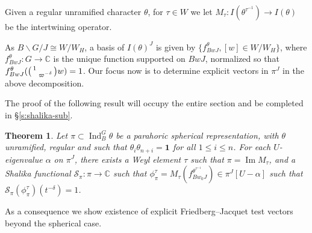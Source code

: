 \documentclass{amsart}
\newtheorem{theorem}[thm]{Theorem}
\theoremstyle{definition}
\newcommand{\Ind}{\operatorname{Ind}}
\renewcommand{\Im}{\operatorname{Im}}
\newenvironment{spmatrix}{\left(\begin{smallmatrix}}{\end{smallmatrix}\right)}
\begin{document}
{%


Given a regular unramified character $\theta$, for  $\tau\in W$ we let  $M_\tau:I(\theta^{\tau^{-1}})\to
I(\theta)$ be the intertwining operator. 


 As  $B \backslash G/ J\cong  W/W_H$, a basis of $I(\theta)^J$ is given by   $\{ f^\theta_{BwJ}, [w]\in W/W_H\}$,  
where $f^\theta_{BwJ}:G\to \mathbb{C}$ is the unique function  supported on $BwJ$, normalized so that $f^\theta_{BwJ}(\begin{spmatrix} 1&\\&\varpi^{-\delta}\end{spmatrix}w)=1$. Our  focus now is  to determine explicit vectors in $\pi^J$ in the above decomposition.






The proof of the following result will occupy the entire section and be completed in   \S\ref{s:shalika-sub}. 
\begin{theorem}\label{t:shalika-sub}
Let $\pi\subset\Ind_B^G\theta$ be a parahoric spherical representation,  with   $\theta$ unramified, regular 
and such that $\theta_i\theta_{n+i}=\mathbf{1}$ for all $1\leqslant i\leqslant n$. For each $U$-eigenvalue $\alpha$ on $\pi^J$, 
there exists a Weyl element $\tau$ such that $\pi=\Im M_\tau$, and a  Shalika
functional $\mathcal{S}_\pi:\pi\to \mathbb{C}$ such that $\phi_\pi^\tau=M_\tau (f_{Bw_0J}^{\theta^{\tau^{-1}}})\in \pi^J[U-\alpha]$
such that   $\mathcal{S}_\pi(\phi_\pi^\tau)(t^{-\delta})=1$.
\end{theorem}


As a consequence we show existence of explicit Friedberg--Jacquet  test vectors beyond the spherical case. 

}
\end{document}
